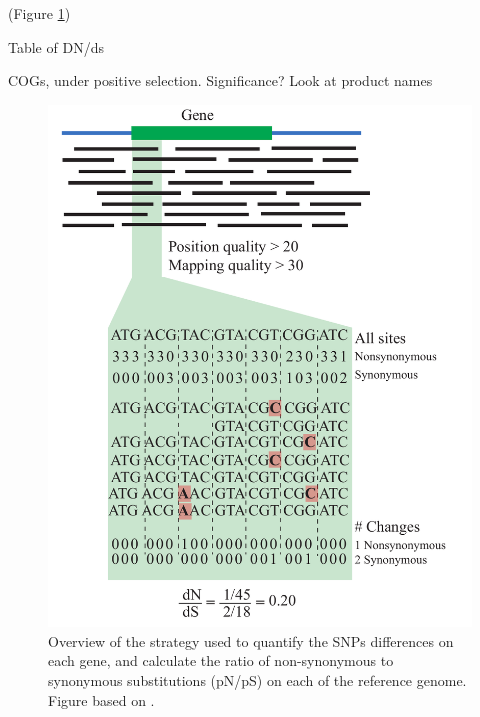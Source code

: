 (Figure \ref{MappingStrategy})



Table of DN/ds

COGs, under positive selection. Significance?
Look at product names







\begin{figure}[!hbtp]
  \centering
  \includegraphics[width=\textwidth]{Chapter5/Figures/MappingStrategy.pdf}
  \caption{Overview of the strategy used to quantify the SNPs differences on each gene, and calculate the ratio of non-synonymous to synonymous substitutions (pN/pS) on each of the reference genome. Figure based on \cite{Tai:2011jo}.}
  \label{MappingStrategy}
\end{figure}

